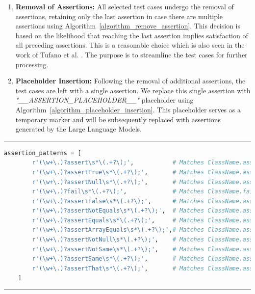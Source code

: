     \begin{enumerate}
        \item \textbf{Removal of Assertions:} All selected test cases undergo the removal of assertions, retaining only the last assertion in case there are multiple assertions using Algorithm~\ref{algorithm_remove_assertion}. This decision is based on the likelihood that reaching the last assertion implies satisfaction of all preceding assertions. This is a reasonable choice which is also seen in the work of Tufano et al. \cite{tufano_generating_2022}. The purpose is to streamline the test cases for further processing.

        \item \textbf{Placeholder Insertion:} Following the removal of additional assertions, the test cases are left with a single assertion. We replace this single assertion with \textit{"\_\_ASSERTION\_PLACEHOLDER\_\_"} placeholder using Algorithm~\ref{algorithm_placeholder_insertion}. This placeholder serves as a temporary marker and will be subsequently replaced with assertions generated by the Large Language Models.
    \end{enumerate}

    \hrule
    \begin{lstlisting}[language=Python, caption=Assertion selection Regex, label=assertions_regex]
    assertion_patterns = [
        r'(\w+\.)?assert\s*\(.+?\);',           # Matches ClassName.assert(...)
        r'(\w+\.)?assertTrue\s*\(.+?\);',       # Matches ClassName.assertTrue(...)
        r'(\w+\.)?assertNull\s*\(.+?\);',       # Matches ClassName.assertNull(...)
        r'(\w+\.)?fail\s*\(.+?\);',             # Matches ClassName.fail(...)
        r'(\w+\.)?assertFalse\s*\(.+?\);',      # Matches ClassName.assertFalse(...)
        r'(\w+\.)?assertNotEquals\s*\(.+?\);',  # Matches ClassName.assertNotEquals(...)
        r'(\w+\.)?assertEquals\s*\(.+?\);',     # Matches ClassName.assertEquals(...)
        r'(\w+\.)?assertArrayEquals\s*\(.+?\);',# Matches ClassName.assertArrayEquals(...)
        r'(\w+\.)?assertNotNull\s*\(.+?\);',    # Matches ClassName.assertNotNull(...)
        r'(\w+\.)?assertNotSame\s*\(.+?\);',    # Matches ClassName.assertNotSame(...)
        r'(\w+\.)?assertSame\s*\(.+?\);',       # Matches ClassName.assertSame(...)
        r'(\w+\.)?assertThat\s*\(.+?\);',       # Matches ClassName.assertThat(...)
    ]
    \end{lstlisting}
    \hrule
    

